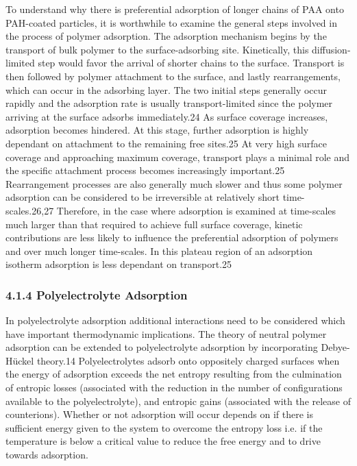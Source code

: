 \documentclass[journal=jacsat,manuscript=article]{achemso}
\begin{document}
To understand why there is preferential adsorption of longer chains of PAA onto PAH-coated particles, it is worthwhile to examine the general steps involved in the process of polymer adsorption.  The adsorption mechanism begins by the transport of bulk polymer to the surface-adsorbing site.  Kinetically, this diffusion-limited step would favor the arrival of shorter chains to the surface.  Transport is then followed by polymer attachment to the surface, and lastly rearrangements, which can occur in the adsorbing layer.  The two initial steps generally occur rapidly and the adsorption rate is usually transport-limited since the polymer arriving at the surface adsorbs immediately.24  As surface coverage increases, adsorption becomes hindered.  At this stage, further adsorption is highly dependant on attachment to the remaining free sites.25  At very high surface coverage and approaching maximum coverage, transport plays a minimal role and the specific attachment process becomes increasingly important.25  Rearrangement processes are also generally much slower and thus some polymer adsorption can be considered to be irreversible at relatively short time-scales.26,27  Therefore, in the case where adsorption is examined at time-scales much larger than that required to achieve full surface coverage, kinetic contributions are less likely to influence the preferential adsorption of polymers and over much longer time-scales.  In this plateau region of an adsorption isotherm adsorption is less dependant on transport.25



\subsubsection{4.1.4 Polyelectrolyte Adsorption}

In polyelectrolyte adsorption additional interactions need to be considered which have important thermodynamic implications. The theory of neutral polymer adsorption can be extended to polyelectrolyte adsorption by incorporating Debye-Hückel theory.14  Polyelectrolytes adsorb onto oppositely charged surfaces when the energy of adsorption exceeds the net entropy resulting from the culmination of entropic losses (associated with the reduction in the number of configurations available to the polyelectrolyte), and entropic gains (associated with the release of counterions).  Whether or not adsorption will occur depends on if there is sufficient energy given to the system to overcome the entropy loss i.e. if the temperature is below a critical value to reduce the free energy and to drive towards adsorption.
\end{document}
